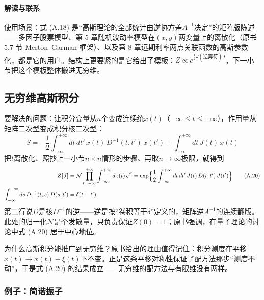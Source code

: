\paragraph{解读与联系}
使用场景：式 (A.18) 是“高斯理论的全部统计由逆协方差$A^{-1}$决定”的矩阵版陈述——多因子股票模型、第 5 章随机波动率模型在$(x,y)$两变量上的离散化（原书 5.7 节 Merton--Garman 框架）、以及第 8 章远期利率两点关联函数的高斯参数化，都是它的用户。结构上更要紧的是它给出了模板：$Z\propto e^{\frac{1}{2}J(\text{逆算符})J}$，下一小节把这个模板整体搬进无穷维。

\subsection{无穷维高斯积分}

要解决的问题：让积分变量从$n$个变成连续统$x(t)$（$-\infty\le t\le+\infty$），作用量从矩阵二次型变成积分核二次型：
\begin{equation*}
S=-\frac{1}{2}\int_{-\infty}^{+\infty}dt\,dt'\,
x(t)\,D^{-1}(t,t')\,x(t')
+\int_{-\infty}^{+\infty}dt\,J(t)\,x(t)
\tag{A.19}
\end{equation*}
把$t$离散化、照抄上一小节$n\times n$情形的步骤、再取$n\to\infty$极限，就得到
\begin{align*}
Z[J]
&=\mathcal{N}\prod_{t=-\infty}^{+\infty}
\int_{-\infty}^{+\infty}dx(t)\,e^{S}
=\exp\Bigl\{\frac{1}{2}\int_{-\infty}^{+\infty}dt\,dt'\,
J(t)\,D(t,t')\,J(t')\Bigr\}
\tag{A.20}\\
\int_{-\infty}^{+\infty}ds\,D^{-1}(t,s)\,D(s,t')&=\delta(t-t')
\end{align*}
第二行说$D$是核$D^{-1}$的逆——逆是按“卷积等于$\delta$”定义的，矩阵逆$A^{-1}$的连续翻版。此处的归一化$\mathcal{N}$是个发散量，只负责保证$Z(0)=1$；原书强调，在量子理论的讨论中式 (A.20) 居于中心地位。

为什么高斯积分能推广到无穷维？原书给出的理由值得记住：积分测度在平移$x(t)\to x(t)+\xi(t)$下不变。正是这条平移对称性保证了配方法那步“测度不动”，于是式 (A.20) 的结果成立——无穷维的配方法与有限维没有两样。

\subsubsection*{例子：简谐振子}

